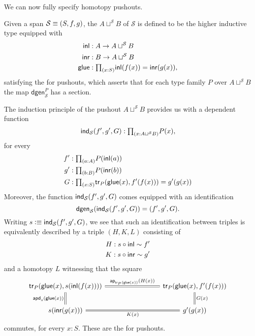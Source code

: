 We can now fully specify homotopy pushouts.

\begin{defn}
Given a span $\mathcal{S}\equiv (S,f,g)$, the  $A\sqcup^{\mathcal{S}} B$ of $\mathcal{S}$ is defined to be the higher inductive type equipped with
\begin{align*}
\inl & : A \to A \sqcup^{\mathcal{S}} B \\
\inr & : B \to A \sqcup^{\mathcal{S}} B \\
\glue & : \prd{x:S} \inl(f(x))=\inr(g(x)),
\end{align*}
satisfying the  for pushouts, which asserts that for each type family $P$ over $A\sqcup^{\mathcal{S}} B$ the map $\mathsf{dgen}_{\mathcal{S}}^P$ has a section.
\end{defn}

\begin{rmk}
The induction principle of the pushout $A\sqcup^{\mathcal{S}} B$ provides us with a dependent function
\begin{equation*}
\ind{\mathcal{S}}(f',g',G) : \prd{x:A\sqcup^{\mathcal{S}} B} P(x),
\end{equation*}
for every
\begin{align*}
f' & : \prd{a:A}P(\inl(a)) \\
g' & : \prd{b:B}P(\inr(b)) \\
G & : \prd{x:S} \mathsf{tr}_P(\glue(x),f'(f(x)))=g'(g(x))
\end{align*}
Moreover, the function $\mathsf{ind}_{\mathcal{S}}(f',g',G)$ comes equipped with an identification
\begin{equation*}
\mathsf{dgen}_{\mathcal{S}}(\mathsf{ind}_{\mathcal{S}}(f',g',G))=(f',g',G).
\end{equation*}
Writing $s\vcentcolon\equiv \mathsf{ind}_{\mathcal{S}}(f',g',G)$, we see that such an identification between triples is equivalently described by a triple $(H,K,L)$ consisting of
\begin{align*}
H : s\circ {\mathsf{inl}} \sim f' \\
K : s\circ{\mathsf{inr}} \sim g' 
\end{align*}
and a homotopy $L$ witnessing that the square
\begin{equation*}
\begin{tikzcd}[column sep=8em]
\mathsf{tr}_{P}(\glue(x),s(\inl(f(x)))) \arrow[r,equals,"\ap{\mathsf{tr}_P(\glue(x))}{H(x)}"] \arrow[d,equals,swap,"\apd{s}{\glue(x)}"] & \mathsf{tr}_{P}(\glue(x),f'(f(x))) \arrow[d,equals,"G(x)"] \\
s(\inr(g(x))) \arrow[r,equals,swap,"K(x)"] & g'(g(x))
\end{tikzcd}
\end{equation*}
commutes, for every $x:S$. These are the  for pushouts.
\end{rmk}

